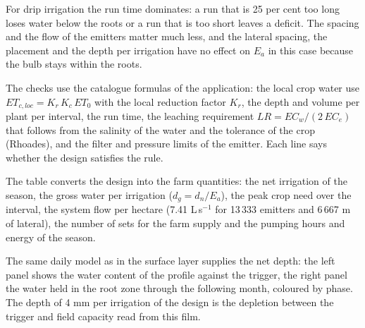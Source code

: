 
For drip irrigation the run time dominates: a run that is 25 per cent too long loses water below the roots or a run that is too short leaves a deficit. The spacing and the flow of the emitters matter much less, and the lateral spacing, the placement and the depth per irrigation have no effect on $E_a$ in this case because the bulb stays within the roots.


The checks use the catalogue formulas of the application: the local crop water use $ET_{c,loc}=K_r\,K_c\,ET_0$ with the local reduction factor $K_r$, the depth and volume per plant per interval, the run time, the leaching requirement $LR=EC_w/(2\,EC_e)$ that follows from the salinity of the water and the tolerance of the crop (Rhoades), and the filter and pressure limits of the emitter. Each line says whether the design satisfies the rule.


The table converts the design into the farm quantities: the net irrigation of the season, the gross water per irrigation ($d_g=d_n/E_a$), the peak crop need over the interval, the system flow per hectare (7.41 L\,s$^{-1}$ for 13\,333 emitters and 6\,667 m of lateral), the number of sets for the farm supply and the pumping hours and energy of the season.


The same daily model as in the surface layer supplies the net depth: the left panel shows the water content of the profile against the trigger, the right panel the water held in the root zone through the following month, coloured by phase. The depth of 4 mm per irrigation of the design is the depletion between the trigger and field capacity read from this film.



